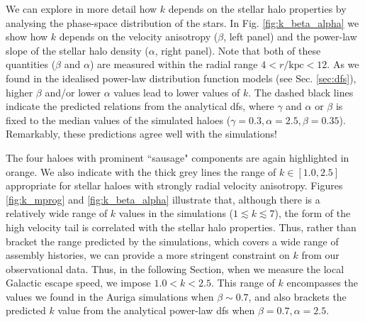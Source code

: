 \documentclass[fleqn,usenatbib]{mnras}
\begin{document}
We can explore in more detail how $k$ depends on the stellar halo properties by analysing the phase-space distribution of the stars. In Fig. \ref{fig:k_beta_alpha} we show how $k$ depends on the velocity anisotropy ($\beta$, left panel) and the power-law slope of the stellar halo density ($\alpha$, right panel). Note that both of these quantities ($\beta$ and $\alpha$) are measured within the radial range $4 < r/\mathrm{kpc} < 12$. As we found in the idealised power-law distribution function models (see Sec. \ref{sec:dfs}), higher $\beta$ and/or lower $\alpha$ values lead to lower values of $k$. The dashed black lines indicate the predicted relations from the analytical dfs, where $\gamma$ and $\alpha$ or $\beta$ is fixed to the median values of the simulated haloes ($\gamma=0.3, \alpha=2.5, \beta=0.35$). Remarkably, these predictions agree well with the simulations!

The four haloes with prominent ``sausage" components are again highlighted in orange. We also indicate with the thick grey lines the range of $k \in [1.0,2.5]$ appropriate for stellar haloes with strongly radial velocity anisotropy. Figures \ref{fig:k_mprog} and \ref{fig:k_beta_alpha} illustrate that, although there is a relatively wide range of $k$ values in the simulations ($ 1 \lesssim k \lesssim 7$), the form of the high velocity tail is correlated with the stellar halo properties. Thus, rather than bracket the range predicted by the simulations, which covers a wide range of assembly histories, we can provide a more stringent constraint on $k$ from our observational data. Thus, in the following Section, when we measure the local Galactic escape speed, we impose $1.0 < k < 2.5$. This range of $k$ encompasses the values we found in the Auriga simulations when $\beta \sim 0.7$, and also brackets the predicted $k$ value from the analytical power-law dfs when $\beta=0.7, \alpha=2.5$.
\end{document}
